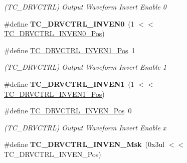 \begin{DoxyCompactItemize}
\begin{DoxyCompactList}\small\item\em (T\+C\+\_\+\+D\+R\+V\+C\+T\+R\+L) Output Waveform Invert Enable 0 \end{DoxyCompactList}\item 
\hypertarget{group___s_a_m_l21___t_c_ga323c70589488e21a4aa9c75b151f6e10}{}\#define {\bfseries T\+C\+\_\+\+D\+R\+V\+C\+T\+R\+L\+\_\+\+I\+N\+V\+E\+N0}~(1 $<$$<$ \hyperlink{group___s_a_m_l21___t_c_gaa165efb4190a3164d2d51d1670e977b9}{T\+C\+\_\+\+D\+R\+V\+C\+T\+R\+L\+\_\+\+I\+N\+V\+E\+N0\+\_\+\+Pos})\label{group___s_a_m_l21___t_c_ga323c70589488e21a4aa9c75b151f6e10}

\item 
\hypertarget{group___s_a_m_l21___t_c_gab33e8410c0d96ea539e9cfa4e3043cb5}{}\#define \hyperlink{group___s_a_m_l21___t_c_gab33e8410c0d96ea539e9cfa4e3043cb5}{T\+C\+\_\+\+D\+R\+V\+C\+T\+R\+L\+\_\+\+I\+N\+V\+E\+N1\+\_\+\+Pos}~1\label{group___s_a_m_l21___t_c_gab33e8410c0d96ea539e9cfa4e3043cb5}

\begin{DoxyCompactList}\small\item\em (T\+C\+\_\+\+D\+R\+V\+C\+T\+R\+L) Output Waveform Invert Enable 1 \end{DoxyCompactList}\item 
\hypertarget{group___s_a_m_l21___t_c_ga29adf58659cb90a5b89664525873a7f3}{}\#define {\bfseries T\+C\+\_\+\+D\+R\+V\+C\+T\+R\+L\+\_\+\+I\+N\+V\+E\+N1}~(1 $<$$<$ \hyperlink{group___s_a_m_l21___t_c_gab33e8410c0d96ea539e9cfa4e3043cb5}{T\+C\+\_\+\+D\+R\+V\+C\+T\+R\+L\+\_\+\+I\+N\+V\+E\+N1\+\_\+\+Pos})\label{group___s_a_m_l21___t_c_ga29adf58659cb90a5b89664525873a7f3}

\item 
\hypertarget{group___s_a_m_l21___t_c_ga811926c25d3d94961c74d2276bc953b1}{}\#define \hyperlink{group___s_a_m_l21___t_c_ga811926c25d3d94961c74d2276bc953b1}{T\+C\+\_\+\+D\+R\+V\+C\+T\+R\+L\+\_\+\+I\+N\+V\+E\+N\+\_\+\+Pos}~0\label{group___s_a_m_l21___t_c_ga811926c25d3d94961c74d2276bc953b1}

\begin{DoxyCompactList}\small\item\em (T\+C\+\_\+\+D\+R\+V\+C\+T\+R\+L) Output Waveform Invert Enable x \end{DoxyCompactList}\item 
\hypertarget{group___s_a_m_l21___t_c_ga900a998a963d670fdb46d0b6edae246f}{}\#define {\bfseries T\+C\+\_\+\+D\+R\+V\+C\+T\+R\+L\+\_\+\+I\+N\+V\+E\+N\+\_\+\+Msk}~(0x3ul $<$$<$ T\+C\+\_\+\+D\+R\+V\+C\+T\+R\+L\+\_\+\+I\+N\+V\+E\+N\+\_\+\+Pos)\label{group___s_a_m_l21___t_c_ga900a998a963d670fdb46d0b6edae246f}


\end{DoxyCompactItemize}
